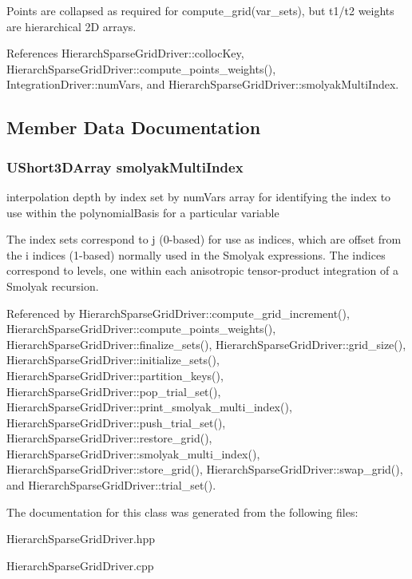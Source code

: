 Points are collapsed as required for compute\+\_\+grid(var\+\_\+sets), but t1/t2 weights are hierarchical 2D arrays. 

References Hierarch\+Sparse\+Grid\+Driver\+::colloc\+Key, Hierarch\+Sparse\+Grid\+Driver\+::compute\+\_\+points\+\_\+weights(), Integration\+Driver\+::num\+Vars, and Hierarch\+Sparse\+Grid\+Driver\+::smolyak\+Multi\+Index.



\subsection{Member Data Documentation}
\subsubsection[{\texorpdfstring{smolyak\+Multi\+Index}{smolyakMultiIndex}}]{\setlength{\rightskip}{0pt plus 5cm}U\+Short3\+D\+Array smolyak\+Multi\+Index\hspace{0.3cm}{\ttfamily [private]}}\label{classPecos_1_1HierarchSparseGridDriver_a1899fc99ce06e7d1dab0c21445725cba}


interpolation depth by index set by num\+Vars array for identifying the index to use within the polynomial\+Basis for a particular variable 

The index sets correspond to j (0-\/based) for use as indices, which are offset from the i indices (1-\/based) normally used in the Smolyak expressions. The indices correspond to levels, one within each anisotropic tensor-\/product integration of a Smolyak recursion. 

Referenced by Hierarch\+Sparse\+Grid\+Driver\+::compute\+\_\+grid\+\_\+increment(), Hierarch\+Sparse\+Grid\+Driver\+::compute\+\_\+points\+\_\+weights(), Hierarch\+Sparse\+Grid\+Driver\+::finalize\+\_\+sets(), Hierarch\+Sparse\+Grid\+Driver\+::grid\+\_\+size(), Hierarch\+Sparse\+Grid\+Driver\+::initialize\+\_\+sets(), Hierarch\+Sparse\+Grid\+Driver\+::partition\+\_\+keys(), Hierarch\+Sparse\+Grid\+Driver\+::pop\+\_\+trial\+\_\+set(), Hierarch\+Sparse\+Grid\+Driver\+::print\+\_\+smolyak\+\_\+multi\+\_\+index(), Hierarch\+Sparse\+Grid\+Driver\+::push\+\_\+trial\+\_\+set(), Hierarch\+Sparse\+Grid\+Driver\+::restore\+\_\+grid(), Hierarch\+Sparse\+Grid\+Driver\+::smolyak\+\_\+multi\+\_\+index(), Hierarch\+Sparse\+Grid\+Driver\+::store\+\_\+grid(), Hierarch\+Sparse\+Grid\+Driver\+::swap\+\_\+grid(), and Hierarch\+Sparse\+Grid\+Driver\+::trial\+\_\+set().



The documentation for this class was generated from the following files\+:\begin{DoxyCompactItemize}
\item 
Hierarch\+Sparse\+Grid\+Driver.\+hpp\item 
Hierarch\+Sparse\+Grid\+Driver.\+cpp\end{DoxyCompactItemize}
